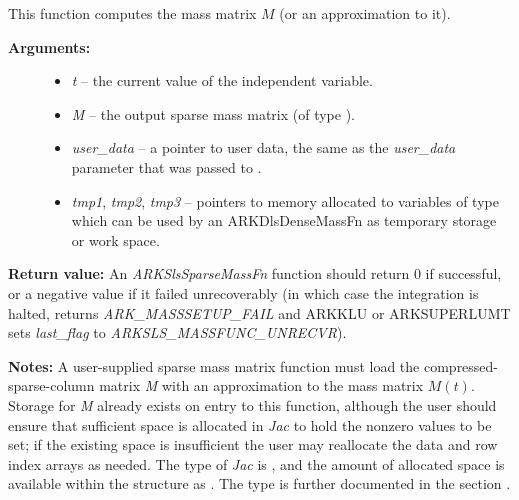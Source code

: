 \documentclass[letterpaper,10pt,english]{sphinxmanual}
\begin{document}
\begin{fulllineitems}
\label{c_interface/User_supplied:c.ARKSlsSparseMassFn}
This function computes the mass matrix \(M\) (or an approximation to it).
\begin{description}
\item[{\textbf{Arguments:}}] \leavevmode\begin{itemize}
\item {} 
\emph{t} -- the current value of the independent variable.

\item {} 
\emph{M} -- the output sparse mass matrix (of type ).

\item {} 
\emph{user\_data} -- a pointer to user data, the same as the
\emph{user\_data} parameter that was passed to {\hyperref[c_interface/User_callable:c.ARKodeSetUserData]{\emph{}}}.

\item {} 
\emph{tmp1}, \emph{tmp2}, \emph{tmp3} -- pointers to memory allocated to
variables of type  which can be used by an
ARKDlsDenseMassFn as temporary storage or work space.

\end{itemize}

\end{description}

\textbf{Return value:}
An \emph{ARKSlsSparseMassFn} function should return 0 if
successful, or a negative value if it failed unrecoverably (in
which case the integration is halted, {\hyperref[c_interface/User_callable:c.ARKode]{\emph{}}} returns
\emph{ARK\_MASSSETUP\_FAIL} and ARKKLU or ARKSUPERLUMT sets \emph{last\_flag} to
\emph{ARKSLS\_MASSFUNC\_UNRECVR}).

\textbf{Notes:} A user-supplied sparse mass matrix function must load the
compressed-sparse-column matrix \emph{M} with an approximation to the
mass matrix \(M(t)\).  Storage for \emph{M} already exists on entry
to this function, although the user should ensure that sufficient
space is allocated in \emph{Jac} to hold the nonzero values to be set;
if the existing space is insufficient the user may reallocate the
data and row index arrays as needed.  The type of \emph{Jac} is
, and the amount of allocated space is available within
the  structure as .  The  type is
further documented in the section {\hyperref[linear_solvers/index:linearsolvers]{\emph{}}}.

\end{fulllineitems}
\end{document}
